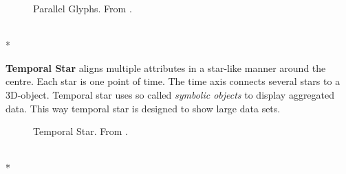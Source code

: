 \begin{figure}[H]
    \centering
    \caption{Parallel Glyphs. From \cite{Aigner2011}.}
    \label{fig:parallelglyphs}
\end{figure}\\*

\textbf{Temporal Star} aligns multiple attributes in a star-like manner around the centre. Each star is one point of time. The time axis connects several stars to a 3D-object. Temporal star uses so called \textit{symbolic objects} to display aggregated data. This way temporal star is designed to show large data sets. 
\begin{figure}[H]
    \centering
    \caption{Temporal Star. From \cite{Aigner2011}.}
    \label{fig:temporalstar}
\end{figure}\\*

